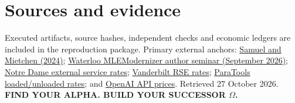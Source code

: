 \documentclass[10pt,letterpaper]{article}
\begin{document}
\section{Sources and evidence}
\small
Executed artifacts, source hashes, independent checks and economic ledgers are included in the reproduction package. Primary external anchors: \href{https://doi.org/10.1093/gigascience/giad113}{Samuel and Mietchen (2024)}; \href{https://uwaterloo.ca/computer-science/events/phd-seminar-se-automated-modernization-of-machine-learning-engineering-notebooks-for-reproducibility}{Waterloo MLEModernizer author seminar (September 2026)}; \href{https://edcf.nd.edu/services/}{Notre Dame external service rates}; \href{https://www.vanderbilt.edu/accre/research-software-engineering-service/}{Vanderbilt RSE rates}; \href{https://www.paratools.com/consulting/}{ParaTools loaded/unloaded rates}; and \href{https://developers.openai.com/api/docs/pricing}{OpenAI API prices}. Retrieved 27 October 2026.
\vfill
{\sffamily\small\bfseries\color{DeepPurple}FIND YOUR ALPHA. BUILD YOUR SUCCESSOR $\Omega$.}
\end{document}
